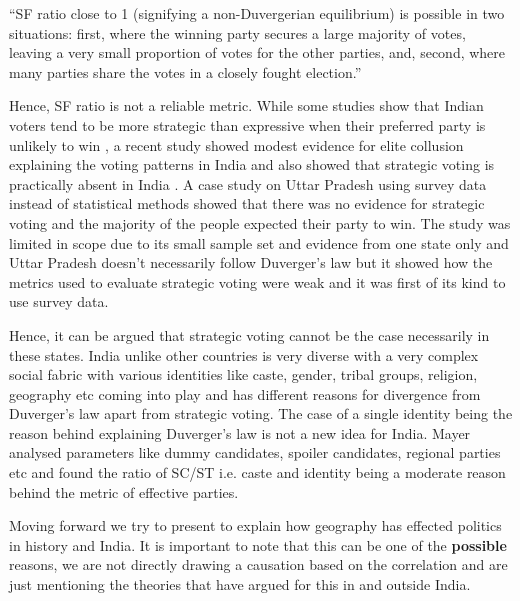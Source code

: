 “SF ratio close to 1 (signifying a non-Duvergerian equilibrium) is possible in two situations: first, where the winning party secures a large majority of votes, leaving a very small proportion of votes for the other parties, and, second, where many parties share the votes in a closely fought election.”

\vspace{0.3cm}

Hence, SF ratio is not a reliable metric. While some studies show that Indian voters tend to be more strategic than expressive when their preferred party is unlikely to win \citep{choi2009strategic}, a recent study showed modest evidence for elite collusion explaining the voting patterns in India and also showed that strategic voting is practically absent in India \citep{ziegfeld2021accounts}. A case study on Uttar Pradesh \citep{heath2022so} using survey data instead of statistical methods showed that there was no evidence for strategic voting and the majority of the people expected their party to win. The study was limited in scope due to its small sample set and evidence from one state only and Uttar Pradesh doesn't necessarily follow Duverger's law but it showed how the metrics used to evaluate strategic voting were weak and it was first of its kind to use survey data. 

\vspace{0.3cm}

Hence, it can be argued that strategic voting cannot be the case necessarily in these states. India unlike other countries is very diverse with a very complex social fabric with various identities like caste, gender, tribal groups, religion, geography etc coming into play and has different reasons for divergence from Duverger's law apart from strategic voting. The case of a single identity being the reason behind explaining Duverger’s law is not a new idea \citep{mayer2013gross} for India. Mayer analysed parameters like dummy candidates, spoiler candidates, regional parties etc and found the ratio of SC/ST i.e. caste and identity being a moderate reason behind the metric of effective parties. 

Moving forward we try to present  to explain how geography has effected politics in history and India. It is important to note that this can be one of the \textbf{possible} reasons, we are not directly drawing a causation based on the correlation and are just mentioning the theories that have argued for this in and outside India.


